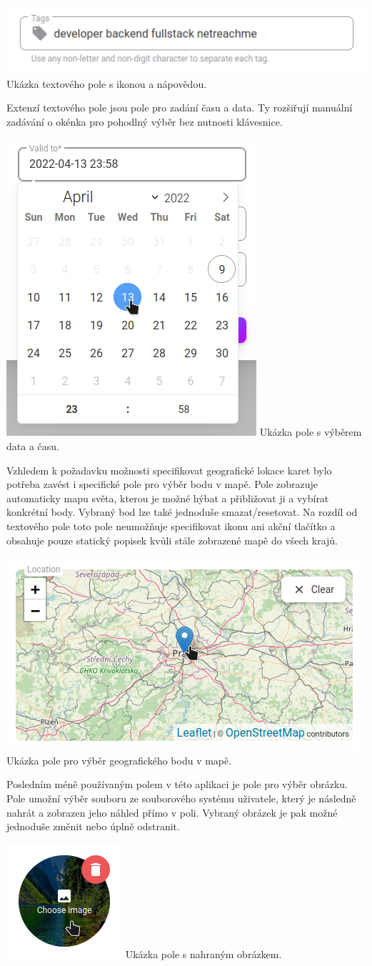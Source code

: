 \begin{itemize}
\begin{itemize}
			\includegraphics[width=0.24\linewidth]{obrazky/textove_pole}\hfill
			Ukázka textového pole s ikonou a nápovědou. %

			Extenzí textového pole jsou pole pro zadání času a data.
			Ty rozšiřují manuální zadávání o okénka pro pohodlný výběr bez nutnosti klávesnice.

			\includegraphics[width=0.24\linewidth]{obrazky/datumove_pole}\hfill
			Ukázka pole s výběrem data a času. %

			Vzhledem k požadavku možnosti specifikovat geografické lokace karet bylo potřeba zavést i specifické pole
			pro výběr bodu v mapě.
			Pole zobrazuje automaticky mapu světa, kterou je možné hýbat a přibližovat ji a vybírat konkrétní body.
			Vybraný bod lze také jednoduše smazat/resetovat.
			Na rozdíl od textového pole toto pole neumožňuje specifikovat ikonu ani akční tlačítko a obsahuje pouze
			statický popisek kvůli stále zobrazené mapě do všech krajů.

			\includegraphics[width=0.24\linewidth]{obrazky/pole_lokace}\hfill
			Ukázka pole pro výběr geografického bodu v mapě. %

			Posledním méně používaným polem v této aplikaci je pole pro výběr obrázku.
			Pole umožní výběr souboru ze souborového systému uživatele, který je následně nahrát a zobrazen jeho náhled
			přímo v poli.
			Vybraný obrázek je pak možné jednoduše změnit nebo úplně odstranit.

			\includegraphics[width=0.24\linewidth]{obrazky/obrazkove_pole}\hfill
			Ukázka pole s nahraným obrázkem. %


\end{itemize}
\end{itemize}
